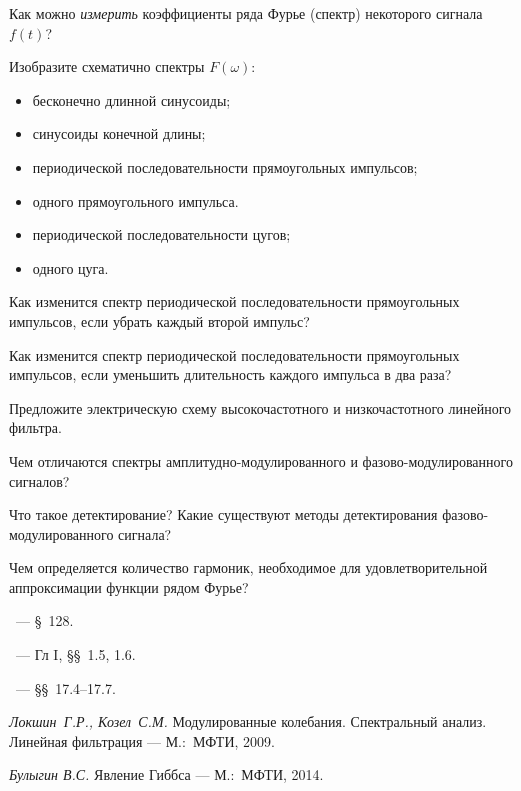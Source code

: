 \begin{lab:questions}
\item Как можно \emph{измерить} коэффициенты ряда Фурье (спектр) некоторого сигнала
$f(t)$?

\item Изобразите схематично спектры $F(\omega)$:
\begin{itemize}
    \item бесконечно длинной синусоиды;
    \item синусоиды конечной длины;
    \item периодической последовательности прямоугольных импульсов;
    \item одного прямоугольного импульса.
    \item периодической последовательности цугов;
    \item одного цуга.
\end{itemize}

\item Как изменится спектр периодической последовательности
прямоугольных импульсов, если убрать каждый второй импульс?

\item Как изменится спектр периодической последовательности прямоугольных
импульсов, если уменьшить длительность каждого импульса в два раза?

\item Предложите электрическую схему высокочастотного и 
низкочастотного линейного фильтра.

\item Чем отличаются спектры амплитудно-модулированного 
и фазово-модулированного сигналов?

\item Что такое детектирование? Какие существуют методы детектирования
фазово-модулированного сигнала?

\item Чем определяется количество гармоник, необходимое для удовлетворительной 
аппроксимации функции рядом Фурье?
\end{lab:questions}


\begin{lab:literature}
    \item \SivuhinIII~--- \S~128.
    \item \KingLokOlh~--- Гл I, \S\S~1.5, 1.6.
    \item \Kirichenko~--- \S\S~17.4--17.7.
    \item \textit{Локшин~Г.Р., Козел~С.М.} Модулированные колебания. Спектральный
анализ. Линейная фильтрация --- М.:~МФТИ, 2009.
\item *\textit{Булыгин В.С.} Явление Гиббса --- М.:~МФТИ, 2014.
\end{lab:literature}





